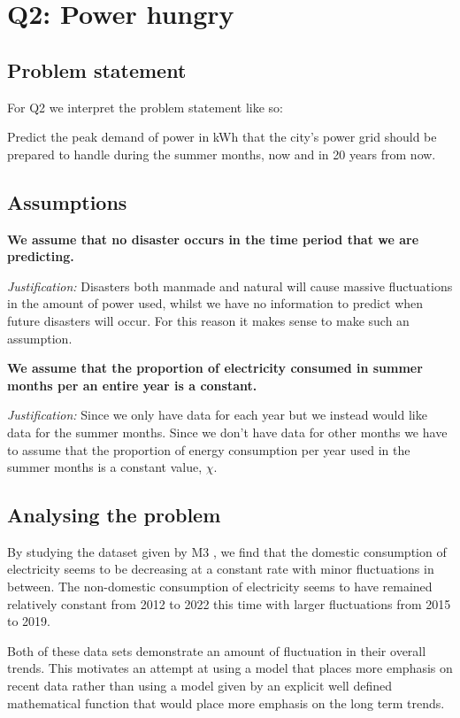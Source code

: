 \documentclass[11pt]{article}
\begin{document}
\section{Q2: Power hungry}

\subsection{Problem statement}

For Q2 we interpret the problem statement like so:

Predict the peak demand of power in kWh that the city’s power grid should be prepared to handle during the summer months,
now and in 20 years from now.

\subsection{Assumptions}

\textbf{\sffamily We assume that no disaster occurs in the time period that we are predicting.}

\textit{Justification:} Disasters both manmade and natural will cause massive fluctuations in the amount of power used, whilst
we have no information to predict when future disasters will occur. For this reason it makes sense to make such an assumption.

\noindent
\textbf{\sffamily We assume that the proportion of electricity consumed in summer months per an entire year is a constant.}

\textit{Justification:} Since we only have data for each year but we instead would like data for the summer months. Since we
don't have data for other months we have to assume that the proportion of energy consumption per year used in the summer
months is a constant value, $\chi$.

\subsection{Analysing the problem}

By studying the dataset given by M3 \cite{m3}, we find that the domestic consumption of electricity seems to be decreasing at
a constant rate with minor fluctuations in between. The non-domestic consumption of electricity seems to have remained
relatively constant from 2012 to 2022 this time with larger fluctuations from 2015 to 2019.

Both of these data sets demonstrate an amount of fluctuation in their overall trends. This motivates an attempt at using a
model that places more emphasis on recent data rather than using a model given by an explicit well defined mathematical
function that would place more emphasis on the long term trends.
\end{document}
